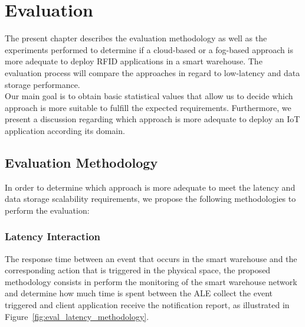 
\chapter{Evaluation}
\label{chapter:evaluation}
The present chapter describes the evaluation methodology as well as the experiments performed to determine
if a cloud-based or a fog-based approach is more adequate to deploy \gls{RFID} applications in a
smart warehouse. The evaluation process will compare the approaches in regard to low-latency and data
storage performance.\\

Our main goal is to obtain basic statistical values that allow us to decide which approach is more
suitable to fulfill the expected requirements. Furthermore, we present a discussion regarding which
approach is more adequate to deploy an \gls{IoT} application according its domain.

\section{Evaluation Methodology}
\label{sec:eval_methodology}
In order to determine which approach is more adequate to meet the latency and data storage scalability
requirements, we propose the following methodologies to perform the evaluation:

\subsection{Latency Interaction}
\label{sub:eval_methodology_latency}
The response time between an event that occurs in the smart warehouse and the corresponding action
that is triggered in the physical space, the proposed methodology consists in perform the monitoring
of the smart warehouse network and determine how much time is spent between the \gls{ALE} collect the
event triggered and client application receive the notification report, as illustrated in
Figure~\ref{fig:eval_latency_methodology}.

